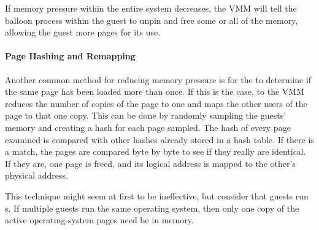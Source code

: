 If memory pressure within the entire system decreases, the VMM will tell the balloon process within the guest to unpin and free some or all of the memory, allowing the guest more pages for its use.

\paragraph{Page Hashing and Remapping}\label{par:Hash_VMem_Remap}
Another common method for reducing memory pressure is for the  to determine if the same page has been loaded more than once.
If this is the case, to the VMM reduces the number of copies of the page to one and maps the other users of the page to that one copy.
This can be done by randomly sampling the guests' memory and creating a hash for each page sampled.
The hash of every page examined is compared with other hashes already stored in a hash table.
If there is a match, the pages are compared byte by byte to see if they really are identical.
If they are, one page is freed, and its logical address is mapped to the other’s physical address.

This technique might seem at first to be ineffective, but consider that guests run s.
If multiple guests run the same operating system, then only one copy of the active operating-system pages need be in memory.


